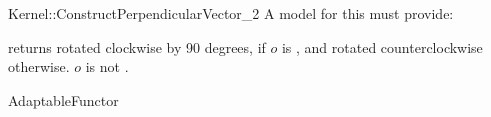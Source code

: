 \begin{ccRefFunctionObjectConcept}{Kernel::ConstructPerpendicularVector_2}
A model for this must provide:


{returns  rotated clockwise by 90 degrees, if $o$ is
, and rotated counterclockwise otherwise.
\ccPrecond $o$ is not .
}

\ccRefines
AdaptableFunctor

\ccSeeAlso
{} \\

\end{ccRefFunctionObjectConcept}
